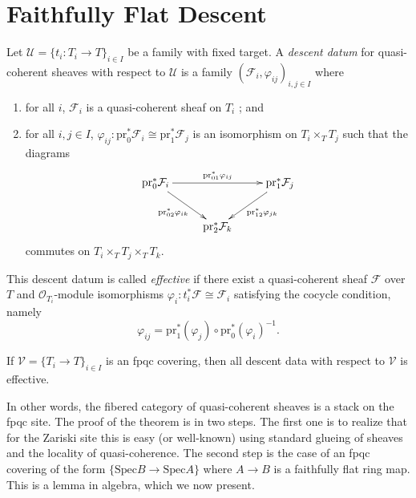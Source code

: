\section{Faithfully Flat Descent}
\label{section-fpqc-descent}

\begin{definition}
\label{definition-descent-datum}
Let $\mathcal{U} = \{ t_i : T_i \to T\}_{i \in I}$ be a family with fixed
target. A {\it descent datum} for quasi-coherent sheaves with respect to
$\mathcal{U}$ is a family $(\mathcal{F}_i, \varphi_{ij})_{i,j\in I}$ where
\begin{enumerate}
\item for all $i$, $\mathcal{F}_i$ is a quasi-coherent sheaf on $T_i$ ; and
\item for all $i, j \in I$, $\varphi_{ij} : \text{pr}_0^* \mathcal{F}_i \cong
\text{pr}_1^* \mathcal{F}_j$ is an isomorphism on $T_i \times_T T_j$ such that
the diagrams
$$
\xymatrix{
{\text{pr}_0^* \mathcal{F}_i} \ar_{\text{pr}_{02}^*\varphi_{ik}}[dr]
\ar^{\text{pr}_{01}^*\varphi_{ij}}[rr] & & {\text{pr}_1^*
\mathcal{F}_j}\ar^{\text{pr}_{12}^*\varphi_{jk}}[dl] \\
& {\text{pr}_2^* \mathcal{F}_k}
}
$$
commutes on $T_i \times_T T_j \times_T T_k$.
\end{enumerate}
This descent datum is called {\it effective} if there exist a quasi-coherent
sheaf $\mathcal{F}$ over $T$ and $\mathcal{O}_{T_i}$-module isomorphisms
$\varphi_i : t_i^* \mathcal{F} \cong \mathcal{F}_i$ satisfying the cocycle
condition, namely
$$
\varphi_{ij} = \text{pr}_1^* (\varphi_j) \circ \text{pr}_0^* (\varphi_i)^{-1}.
$$
\end{definition}

\begin{theorem}
\label{theorem-descent-quasi-coherent}
If $\mathcal{V} = \{T_i \to T\}_{i\in I}$ is an fpqc covering, then all
descent data with respect to $\mathcal{V}$ is effective.
\end{theorem}

\noindent
In other words, the fibered category of quasi-coherent sheaves is a stack on
the fpqc site.
The proof of the theorem is in two steps. The first one is to realize that for
the Zariski site this is easy (or well-known) using standard glueing of sheaves
and the locality of quasi-coherence. The second step is the case of an
fpqc covering of the form $\{ \text{Spec} B \to \text{Spec} A\}$ where $A \to
B$ is a faithfully flat ring map. This is a lemma in algebra, which we now
present.


